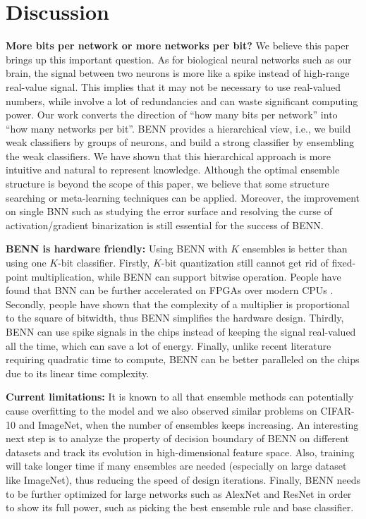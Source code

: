 \documentclass[10pt,twocolumn,letterpaper]{article}
\begin{document}
\section{Discussion}
\label{sec:discussion}
\textbf{More bits per network or more networks per bit? } We believe this paper brings up this important question. As for biological neural networks such as our brain, the signal between two neurons is more like a spike instead of high-range real-value signal. This implies that it may not be necessary to use real-valued numbers, while involve a lot of redundancies and can waste significant computing power. Our work converts the direction of ``how many bits per network'' into ``how many networks per bit''. BENN provides a hierarchical view, i.e., we build weak classifiers by  groups of neurons, and build a strong classifier by ensembling the weak classifiers. We have shown that this hierarchical approach is more intuitive and natural to represent knowledge. Although the optimal ensemble structure is beyond the scope of this paper, we believe that some structure searching or meta-learning techniques can be applied. Moreover, the improvement on single BNN such as studying the error surface and resolving the curse of activation/gradient binarization is still essential for the success of BENN.

\textbf{BENN is hardware friendly:} Using BENN with $K$ ensembles is better than using one $K$-bit classifier. Firstly, $K$-bit quantization still cannot get rid of fixed-point multiplication, while BENN can support bitwise operation. People have found that BNN can be further accelerated on FPGAs over modern CPUs \cite{zhao2017accelerating, fu2018towards}. Secondly, people have shown that the complexity of a multiplier is proportional to the square of bitwidth, thus BENN simplifies the hardware design. Thirdly, BENN can use spike signals in the chips instead of keeping the signal real-valued all the time, which can save a lot of energy. Finally, unlike recent literature requiring quadratic time to compute, BENN can be better paralleled on the chips due to its linear time complexity.

\textbf{Current limitations: } It is known to all that ensemble methods can potentially cause overfitting to the model and we also observed similar problems on CIFAR-10 and ImageNet, when the number of ensembles keeps increasing. An interesting next step is to analyze the property of decision boundary of BENN on different datasets and track its evolution in high-dimensional feature space. Also, training will take longer time if many ensembles are needed (especially on large dataset like ImageNet), thus reducing the speed of design iterations. Finally, BENN needs to be further optimized for large networks such as AlexNet and ResNet in order to show its full power, such as picking the best ensemble rule and base classifier.
\end{document}
